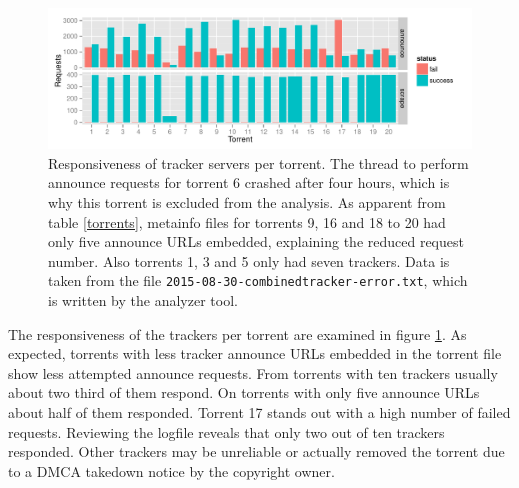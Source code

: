\documentclass[10pt, a4paper, twoside, headsepline]{scrbook}
\renewcommand{\_}{\origunderscore\allowbreak}
\begin{document}
\begin{figure}
\centering
\includegraphics[width=\textwidth]{../result/2015-08-30_20-combined_tracker-error}
\caption[Responsiveness of tracker servers]{Responsiveness of tracker servers per torrent. The thread to perform announce requests for torrent 6 crashed after four hours, which is why this torrent is excluded from the analysis. As apparent from table \ref{torrents}, metainfo files for torrents 9, 16 and 18 to 20 had only five announce URLs embedded, explaining the reduced request number. Also torrents 1, 3 and 5 only had seven trackers. Data is taken from the file \texttt{2015-08-30\_20-combined\_tracker-error.txt}, which is written by the analyzer tool.}
\label{tracker-resp}
\end{figure}

The responsiveness of the trackers per torrent are examined in figure \ref{tracker-resp}. As expected, torrents with less tracker announce URLs embedded in the torrent file show less attempted announce requests. From torrents with ten trackers usually about two third of them respond. On torrents with only five announce URLs about half of them responded. Torrent 17 stands out with a high number of failed requests. Reviewing the logfile reveals that only two out of ten trackers responded. Other trackers may be unreliable or actually removed the torrent due to a DMCA takedown notice by the copyright owner.
\end{document}
